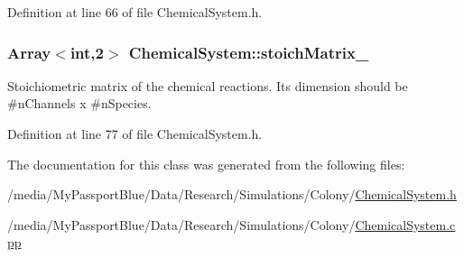 \-Definition at line 66 of file \-Chemical\-System.\-h.

\hypertarget{class_chemical_system_adf3ff92439692f9b4fff0200bce7b1ef}{
\subsubsection[{stoich\-Matrix\-\_\-}]{\setlength{\rightskip}{0pt plus 5cm}\-Array$<$int,2$>$ {\bf \-Chemical\-System\-::stoich\-Matrix\-\_\-}}}\label{class_chemical_system_adf3ff92439692f9b4fff0200bce7b1ef}
\-Stoichiometric matrix of the chemical reactions. \-Its dimension should be \#n\-Channels x \#n\-Species. 

\-Definition at line 77 of file \-Chemical\-System.\-h.



\-The documentation for this class was generated from the following files\-:\begin{DoxyCompactItemize}
\item 
/media/\-My\-Passport\-Blue/\-Data/\-Research/\-Simulations/\-Colony/\hyperlink{_chemical_system_8h}{\-Chemical\-System.\-h}\item 
/media/\-My\-Passport\-Blue/\-Data/\-Research/\-Simulations/\-Colony/\hyperlink{_chemical_system_8cpp}{\-Chemical\-System.\-cpp}\end{DoxyCompactItemize}
